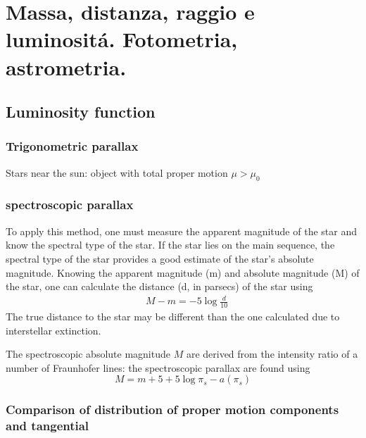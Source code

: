 \chapter{Massa, distanza, raggio e luminosit\'a. Fotometria, astrometria.}
\PartialToc



\section{Luminosity function} 

\subsection{Trigonometric parallax}

Stars near the sun: object with total proper motion $\mu>\mu_0$

\subsection{spectroscopic parallax}

To apply this method, one must measure the apparent magnitude of the star and know the spectral type of the star. If the star lies on the main sequence, the spectral type of the star provides a good estimate of the star's absolute magnitude. Knowing the apparent magnitude (m) and absolute magnitude (M) of the star, one can calculate the distance (d, in parsecs) of the star using
\begin{align*}
&M − m = − 5\log{\frac{d}{10}}    
\end{align*}
The true distance to the star may be different than the one calculated due to interstellar extinction.

The spectroscopic absolute magnitude $M$ are derived from the intensity ratio of a number of Fraunhofer lines: the spectroscopic parallax are found using
\begin{equation*}
M=m+5+5\log{\pi_s}-a(\pi_s)
\end{equation*}

\subsection{Comparison of distribution of proper motion components and tangential}



